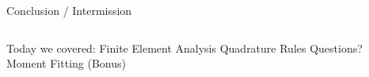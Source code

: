 \begin{frame}{Conclusion / Intermission}
\begin{columns}
\begin{center}
\begin{outline}
\1 Today we covered:
\2 Finite Element Analysis
\2 Quadrature Rules
\1 Questions?
\2 Moment Fitting (Bonus)
\end{outline}
\end{center}

\begin{center}
\end{center}

\end{columns}
\end{frame}
